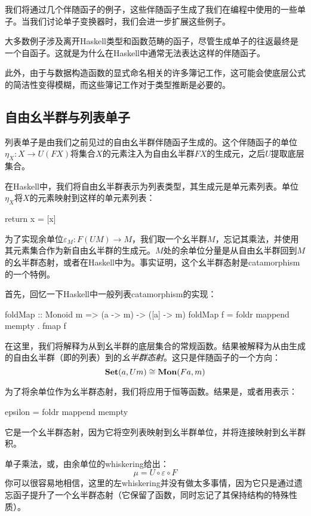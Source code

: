 \documentclass[DaoFP]{subfiles}
\begin{document}
我们将通过几个伴随函子的例子，这些伴随函子生成了我们在编程中使用的一些单子。当我们讨论单子变换器时，我们会进一步扩展这些例子。

大多数例子涉及离开Haskell类型和函数范畴的函子，尽管生成单子的往返最终是一个自函子。这就是为什么在Haskell中通常无法表达这样的伴随函子。

此外，由于与数据构造函数的显式命名相关的许多簿记工作，这可能会使底层公式的简洁性变得模糊，而这些簿记工作对于类型推断是必要的。

\subsection{自由幺半群与列表单子}
列表单子是由我们之前见过的自由幺半群伴随函子生成的。这个伴随函子的单位$\eta_X \colon X \to U (F X)$将集合$X$的元素注入为自由幺半群$F X$的生成元，之后$U$提取底层集合。

在Haskell中，我们将自由幺半群表示为列表类型，其生成元是单元素列表。单位$\eta_X$将$X$的元素映射到这样的单元素列表：
\begin{haskell}
return x = [x]
\end{haskell}
为了实现余单位$\varepsilon_M \colon F (U M) \to M$，我们取一个幺半群$M$，忘记其乘法，并使用其元素集合作为新自由幺半群的生成元。$M$处的余单位分量是从自由幺半群回到$M$的幺半群态射，或者在Haskell中为。事实证明，这个幺半群态射是catamorphism的一个特例。

首先，回忆一下Haskell中一般列表catamorphism的实现：
\begin{haskell}
foldMap :: Monoid m => (a -> m) -> ([a] -> m)
foldMap f = foldr mappend mempty . fmap f
\end{haskell}
在这里，我们将解释为从到幺半群的底层集合的常规函数。结果被解释为从由生成的自由幺半群（即的列表）到的\emph{幺半群态射}。这只是伴随函子的一个方向：
\[ \mathbf{Set} (a, U m) \cong \mathbf{Mon} (F a, m) \]

为了将余单位作为幺半群态射，我们将应用于恒等函数。结果是，或者用表示：
\begin{haskell}
epsilon = foldr mappend mempty
\end{haskell}
它是一个幺半群态射，因为它将空列表映射到幺半群单位，并将连接映射到幺半群积。

单子乘法，或，由余单位的whiskering给出：
\[ \mu = U \circ \varepsilon \circ F \]
你可以很容易地相信，这里的左whiskering并没有做太多事情，因为它只是通过遗忘函子提升了一个幺半群态射（它保留了函数，同时忘记了其保持结构的特殊性质）。
\end{document}

